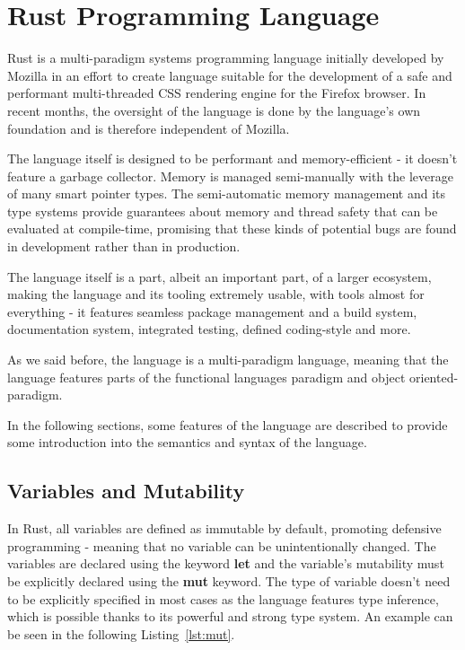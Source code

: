\section{Rust Programming Language}
\label{sec:rust}
Rust is a multi-paradigm systems programming language initially developed by Mozilla in an effort to create language suitable for the development of a safe and performant multi-threaded CSS rendering engine for the Firefox browser\cite{noauthor_servo_nodate}.
In recent months, the oversight of the language is done by the language's own foundation and is therefore independent of Mozilla\cite{noauthor_rust_nodate}.

The language itself is designed to be performant and memory-efficient - it doesn't feature a garbage collector.
Memory is managed semi-manually with the leverage of many smart pointer types.
The semi-automatic memory management and its type systems provide guarantees about memory and thread safety that can be evaluated at compile-time, promising that these kinds of potential bugs are found in development rather than in production.

The language itself is a part, albeit an important part, of a larger ecosystem, making the language and its tooling extremely usable, with tools almost for everything - it features seamless package management and a build system, documentation system, integrated testing, defined coding-style and more.

As we said before, the language is a multi-paradigm language, meaning that the language features parts of the functional languages paradigm and object oriented-paradigm.

In the following sections, some features of the language are described to provide some introduction into the semantics and syntax of the language.
\subsection{Variables and Mutability}
\label{subsec:var_mut}
In Rust, all variables are defined as immutable by default, promoting defensive programming - meaning that no variable can be unintentionally changed.
The variables are declared using the keyword \textbf{let} and the variable's mutability must be explicitly declared using the \textbf{mut} keyword.
The type of variable doesn't need to be explicitly specified in most cases as the language features type inference, which is possible thanks to its powerful and strong type system.
An example can be seen in the following Listing~\ref{lst:mut}.

